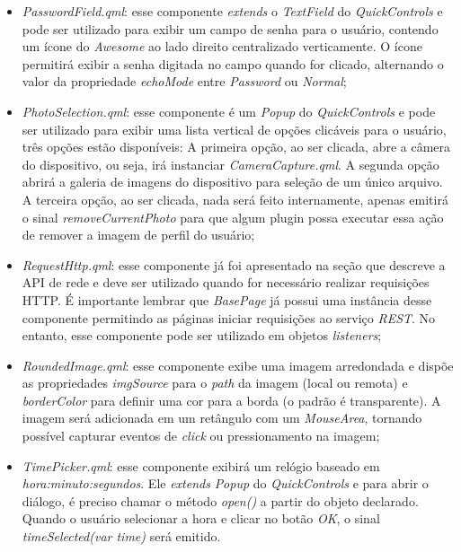 \begin{itemize}
	\item \textit{PasswordField.qml}: esse componente \textit{extends} o \textit{TextField} do \textit{QuickControls} e pode ser utilizado para exibir um campo de senha para o usuário, contendo um ícone do \textit{Awesome} ao lado direito centralizado verticamente. O ícone permitirá exibir a senha digitada no campo quando for clicado, alternando o valor da propriedade \textit{echoMode} entre \textit{Password} ou \textit{Normal};

	\item \textit{PhotoSelection.qml}: esse componente é um \textit{Popup} do \textit{QuickControls} e pode ser utilizado para exibir uma lista vertical de opções clicáveis para o usuário, três opções estão disponíveis: A primeira opção, ao ser clicada, abre a câmera do dispositivo, ou seja, irá instanciar \textit{CameraCapture.qml}. A segunda opção abrirá a galeria de imagens do dispositivo para seleção de um único arquivo. A terceira opção, ao ser clicada, nada será feito internamente, apenas emitirá o sinal \textit{removeCurrentPhoto} para que algum plugin possa executar essa ação de remover a imagem de perfil do usuário;

	\item \textit{RequestHttp.qml}: esse componente já foi apresentado na seção que descreve a API de rede e deve ser utilizado quando for necessário realizar requisições HTTP. É importante lembrar que \textit{BasePage} já possui uma instância desse componente permitindo as páginas iniciar requisições ao serviço \textit{REST}. No entanto, esse componente pode ser utilizado em objetos \textit{listeners};

	\item \textit{RoundedImage.qml}: esse componente exibe uma imagem arredondada e dispõe as propriedades \textit{imgSource} para o \textit{path} da imagem (local ou remota) e \textit{borderColor} para definir uma cor para a borda (o padrão é transparente). A imagem será adicionada em um retângulo com um \textit{MouseArea}, tornando possível capturar eventos de \textit{click} ou pressionamento na imagem;

	\item \textit{TimePicker.qml}: esse componente exibirá um relógio baseado em \textit{hora:minuto:segundos}. Ele \textit{extends} \textit{Popup} do \textit{QuickControls} e para abrir o diálogo, é preciso chamar o método \textit{open()} a partir do objeto declarado. Quando o usuário selecionar a hora e clicar no botão \textit{OK}, o sinal \textit{timeSelected(var time)} será emitido.
\end{itemize}


